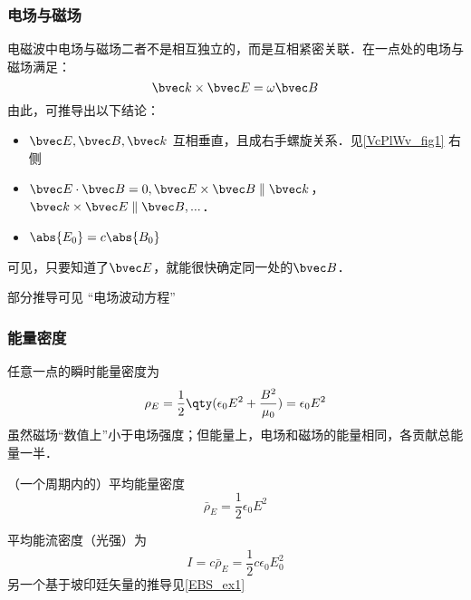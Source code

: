 \subsubsection{电场与磁场}
电磁波中电场与磁场二者不是相互独立的，而是互相紧密关联．在一点处的电场与磁场满足：
\begin{equation}
\bvec k \times \bvec E = \omega \bvec B
\end{equation}
由此，可推导出以下结论：
\begin{itemize}
\item $\bvec E, \bvec B, \bvec k$ 互相垂直，且成右手螺旋关系．见\autoref{VcPlWv_fig1} 右侧
\item $\bvec E \cdot \bvec B = 0,\bvec E \times \bvec B \parallel \bvec k$，$\bvec k \times \bvec E \parallel \bvec B, ...$．
\item $\abs{E_0}=c\abs{B_0}$
\end{itemize}
可见，只要知道了$\bvec E$，就能很快确定同一处的$\bvec B$．

部分推导可见 “电场波动方程”

\subsubsection{能量密度}
任意一点的瞬时能量密度为
\begin{equation}\label{VcPlWv_eq2}
\rho_E = \frac{1}{2}\qty(\epsilon_0 E^2 + \frac{B^2}{\mu_0}) = \epsilon_0 E^2
\end{equation}
虽然磁场“数值上”小于电场强度；但能量上，电场和磁场的能量相同，各贡献总能量一半． 

（一个周期内的）平均能量密度
\begin{equation}
\bar \rho_E = \frac{1}{2} \epsilon_0 E^2
\end{equation}

平均能流密度（光强）为
\begin{equation}
I = c \bar \rho_E = \frac12 c\epsilon_0 E_0^2
\end{equation}
另一个基于坡印廷矢量的推导见\autoref{EBS_ex1}~%


